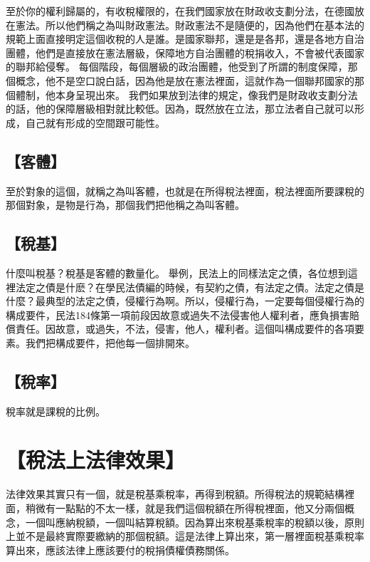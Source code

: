 \documentclass[]{ctexbook}
\begin{document}
至於你的權利歸屬的，有收稅權限的，在我們國家放在財政收支劃分法，在德國放在憲法。所以他們稱之為叫財政憲法。財政憲法不是隨便的，因為他們在基本法的規範上面直接明定這個收稅的人是誰。是國家聯邦，還是是各邦，還是各地方自治團體，他們是直接放在憲法層級，保障地方自治團體的稅捐收入，不會被代表國家的聯邦給侵奪。
每個階段，每個層級的政治團體，他受到了所謂的制度保障，那個概念，他不是空口說白話，因為他是放在憲法裡面，這就作為一個聯邦國家的那個體制，他本身呈現出來。
我們如果放到法律的規定，像我們是財政收支劃分法的話，他的保障層級相對就比較低。因為，既然放在立法，那立法者自己就可以形成，自己就有形成的空間跟可能性。

\hypertarget{ux5ba2ux9ad4}{%
\subsection{【客體】}\label{ux5ba2ux9ad4}}

至於對象的這個，就稱之為叫客體，也就是在所得稅法裡面，稅法裡面所要課稅的那個對象，是物是行為，那個我們把他稱之為叫客體。

\hypertarget{ux7a05ux57fa}{%
\subsection{【稅基】}\label{ux7a05ux57fa}}

什麼叫稅基？稅基是客體的數量化。
舉例，民法上的同樣法定之債，各位想到這裡法定之債是什麽？在學民法債編的時候，有契約之債，有法定之債。法定之債是什麼？最典型的法定之債，侵權行為啊。所以，侵權行為，一定要每個侵權行為的構成要件，民法184條第一項前段因故意或過失不法侵害他人權利者，應負損害賠償責任。因故意，或過失，不法，侵害，他人，權利者。這個叫構成要件的各項要素。我們把構成要件，把他每一個排開來。

\hypertarget{ux7a05ux7387}{%
\subsection{【稅率】}\label{ux7a05ux7387}}

稅率就是課稅的比例。

\hypertarget{ux7a05ux6cd5ux4e0aux6cd5ux5f8bux6548ux679c}{%
\section{【稅法上法律效果】}\label{ux7a05ux6cd5ux4e0aux6cd5ux5f8bux6548ux679c}}

法律效果其實只有一個，就是稅基乘稅率，再得到稅額。所得稅法的規範結構裡面，稍微有一點點的不太一樣，就是我們這個稅額在所得稅裡面，他又分兩個概念，一個叫應納稅額，一個叫結算稅額。因為算出來稅基乘稅率的稅額以後，原則上並不是最終實際要繳納的那個稅額。這是法律上算出來，第一層裡面稅基乘稅率算出來，應該法律上應該要付的稅捐債權債務關係。
\end{document}
